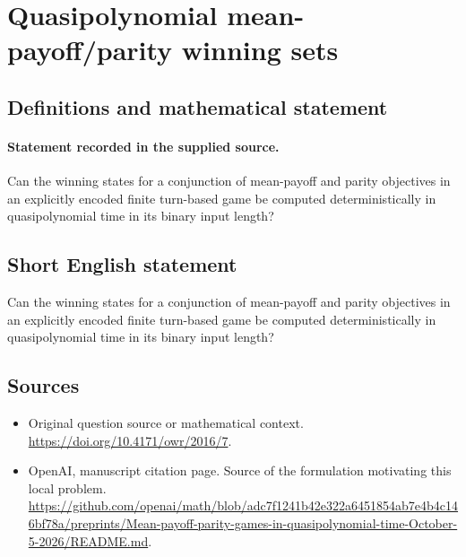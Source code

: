 \documentclass[11pt]{article}
\begin{document}
\section*{Quasipolynomial mean-payoff/parity winning sets}\label{30007464}
\subsection{Definitions and mathematical statement}
\paragraph{Statement recorded in the supplied source.}
Can the winning states for a conjunction of mean-payoff and parity objectives in an explicitly encoded finite turn-based game be computed deterministically in quasipolynomial time in its binary input length?
\subsection{Short English statement}
Can the winning states for a conjunction of mean-payoff and parity objectives in an explicitly encoded finite turn-based game be computed deterministically in quasipolynomial time in its binary input length?
\subsection{Sources}
\begin{itemize}
\item[S1] Original question source or mathematical context.
\url{https://doi.org/10.4171/owr/2016/7}.
\item[S2] OpenAI, manuscript citation page. Source of the formulation motivating this local problem.
\url{https://github.com/openai/math/blob/adc7f1241b42e322a6451854ab7e4b4c146bf78a/preprints/Mean-payoff-parity-games-in-quasipolynomial-time-October-5-2026/README.md}.
\end{itemize}
\end{document}
